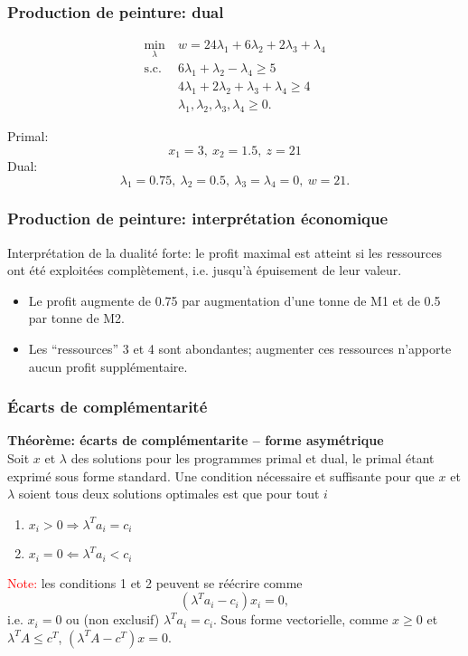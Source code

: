 \documentclass[usepdftitle=false]{beamer}
\begin{document}
\begin{frame}
	\frametitle{Production de peinture: dual}
	
	\begin{align*}
		\min_\lambda \ & w = 24\lambda_1 + 6\lambda_2 + 2\lambda_3 + \lambda_4 \\
		\mbox{s.c. } & 6\lambda_1 + \lambda_2 - \lambda_4 \geq 5 \\
		&4\lambda_1 + 2\lambda_2 + \lambda_3 + \lambda_4 \geq 4 \\
		& \lambda_1, \lambda_2, \lambda_3, \lambda_4 \geq 0.
	\end{align*}
	
	\mbox{}
	
	Primal:
	\[
	x_1 = 3,\ x_2 = 1.5,\ z = 21
	\]
	Dual:
	\[
	\lambda_1 = 0.75,\ \lambda_2 = 0.5,\ \lambda_3 = \lambda_4 = 0,\ w = 21.
	\]
	
\end{frame}

\begin{frame}
	\frametitle{Production de peinture: interprétation économique}
	
	Interprétation de la dualité forte: le profit maximal est atteint si les ressources ont été exploitées complètement, i.e. jusqu’à épuisement de leur valeur.
	
	\mbox{}
	
	\begin{itemize}
		\item
		Le profit augmente de 0.75 par augmentation d'une tonne de M1 et de 0.5 par tonne de M2.
		\item
		Les ``ressources'' 3 et 4 sont abondantes; augmenter ces ressources n'apporte aucun profit supplémentaire.
	\end{itemize}
	
\end{frame}

\begin{frame}
	\frametitle{\'Ecarts de complémentarité}
	
	{\bf Théorème: écarts de complémentarite -- forme asymétrique}\\
	Soit $x$ et $\lambda$ des solutions pour les programmes primal et dual, le primal étant exprimé sous forme standard. Une condition nécessaire et suffisante pour que $x$ et $\lambda$ soient tous deux solutions optimales est que pour tout $i$
	\begin{enumerate}
		\item
		$x_i > 0 \Rightarrow \lambda^T a_i = c_i$
		\item
		$x_i = 0 \Leftarrow \lambda^T a_i < c_i$
	\end{enumerate}
	
	\mbox{}
	
	\textcolor{red}{Note:} les conditions 1 et 2 peuvent se réécrire comme
	$$
	(\lambda^T a_i - c_i)x_i = 0,
	$$
	i.e. $x_i = 0$ ou (non exclusif) $\lambda^T a_i = c_i$. Sous forme vectorielle, comme $x \geq 0$ et $\lambda^T A \leq c^T$, $(\lambda^T A - c^T)x = 0$.
	
\end{frame}
\end{document}
